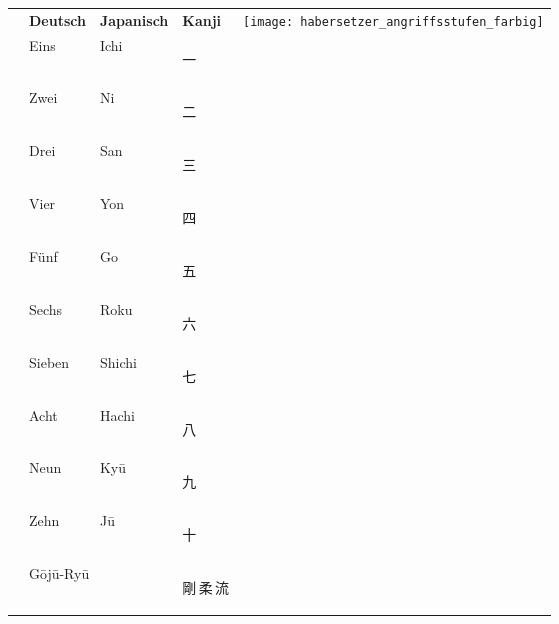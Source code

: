 \begin{tcolorbox}[colframe=lightgray,colback=white,coltitle=black,title=Allgemeines:\indent Zahlen - Angriffsstufen - Begriffe]
	\null\vfill\null	
	\begin{tabularx}{\textwidth}{lllll}		
		& \textbf{Deutsch} 	& \textbf{Japanisch} 	& \textbf{Kanji} &\multirow{13}{*}{\texttt{[image: habersetzer\_angriffsstufen\_farbig]}} \\
		\ctuz 	& Eins 				& Ichi 					& \begin{CJK*}{UTF8}{ipxm}\color{Navy}一\end{CJK*} 	& \\
		\ctuz 	& Zwei 				& Ni 					& \begin{CJK*}{UTF8}{ipxm}\color{Navy}二\end{CJK*} 	& \\ 
		\ctuz 	& Drei 				& San 					& \begin{CJK*}{UTF8}{ipxm}\color{Navy}三\end{CJK*} 	& \\
		\ctuz 	& Vier 				& Yon 					& \begin{CJK*}{UTF8}{ipxm}\color{Navy}四\end{CJK*} 	& \\
		\ctuz 	& Fünf 				& Go 					& \begin{CJK*}{UTF8}{ipxm}\color{Navy}五\end{CJK*} 	& \\
		\ctuz 	& Sechs 			& Roku 					& \begin{CJK*}{UTF8}{ipxm}\color{Navy}六\end{CJK*} 	& \\
		\ctuz 	& Sieben 			& Shichi 				& \begin{CJK*}{UTF8}{ipxm}\color{Navy}七\end{CJK*} 	& \\
		\ctuz 	& Acht 				& Hachi 				& \begin{CJK*}{UTF8}{ipxm}\color{Navy}八\end{CJK*} 	& \\
		\ctuz 	& Neun 				& Kyū 					& \begin{CJK*}{UTF8}{ipxm}\color{Navy}九\end{CJK*} 	& \\
		\ctuz 	& Zehn 				& Jū 					& \begin{CJK*}{UTF8}{ipxm}\color{Navy}十\end{CJK*} 	& \\
		\addlinespace
		& \multicolumn{2}{l}{G\={o}j\={u}-Ry\={u}}	& {\LARGE \begin{CJK*}{UTF8}{ipxm}\color{GKD}剛\,柔\,流\end{CJK*}}        & \\ 	

\end{tabularx}
\end{tcolorbox}
